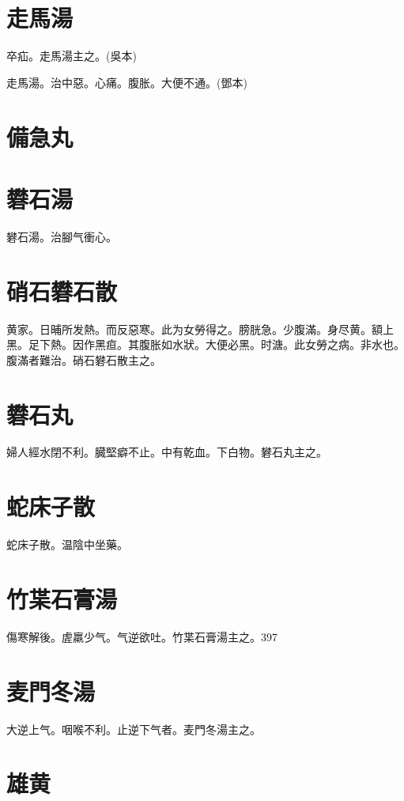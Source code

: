 \documentclass[b5paper,twoside,zihao=-4,UTF8]{ctexbook}
\begin{document}
\section{走馬湯}

卒疝。走馬湯主之。(吳本)

走馬湯。治中惡。心痛。腹胀。大便不通。(鄧本)

\section{備急丸}

\section{礬石湯}

礬石湯。治腳气衝心。

\section{硝石礬石散}

黄家。日晡所发熱。而反惡寒。此为女勞得之。膀胱急。少腹滿。身尽黄。額上黑。足下熱。因作黑疸。其腹胀如水狀。大便必黑。时溏。此女勞之病。非水也。腹滿者難治。硝石礬石散主之。

\section{礬石丸}

婦人經水閉不利。臓堅癖不止。中有乾血。下白物。礬石丸主之。

\section{蛇床子散}

蛇床子散。温陰中坐藥。

\section{竹枼石膏湯}

傷寒解後。虗羸少气。气逆欲吐。竹枼石膏湯主之。397

\section{麦門冬湯}

大逆上气。咽喉不利。止逆下气者。麦門冬湯主之。

\section{雄黄}
\end{document}
